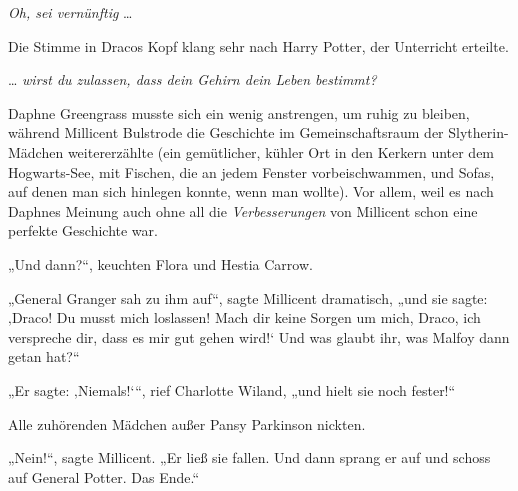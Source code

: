 \emph{Oh, sei vernünftig} …

Die Stimme in Dracos Kopf klang sehr nach Harry Potter, der Unterricht erteilte.

… \emph{wirst du zulassen, dass dein Gehirn dein Leben bestimmt?}


Daphne Greengrass musste sich ein wenig anstrengen, um ruhig zu bleiben, während Millicent Bulstrode die Geschichte im Gemeinschaftsraum der Slytherin-Mädchen weitererzählte (ein gemütlicher, kühler Ort in den Kerkern unter dem Hogwarts-See, mit Fischen, die an jedem Fenster vorbeischwammen, und Sofas, auf denen man sich hinlegen konnte, wenn man wollte). Vor allem, weil es nach Daphnes Meinung auch ohne all die \emph{Verbesserungen} von Millicent schon eine perfekte Geschichte war.

„Und dann?“, keuchten Flora und Hestia Carrow.

„General Granger sah zu ihm auf“, sagte Millicent dramatisch, „und sie sagte: ‚Draco! Du musst mich loslassen! Mach dir keine Sorgen um mich, Draco, ich verspreche dir, dass es mir gut gehen wird!‘ Und was glaubt ihr, was Malfoy dann getan hat?“

„Er sagte: ‚Niemals!‘“, rief Charlotte Wiland, „und hielt sie noch fester!“

Alle zuhörenden Mädchen außer Pansy Parkinson nickten.

„Nein!“, sagte Millicent. „Er ließ sie fallen. Und dann sprang er auf und schoss auf General Potter. Das Ende.“

